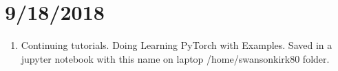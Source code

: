 \documentclass[12pt,reqno]{amsart}
\numberwithin{equation}{section}
\begin{document}
\section{9/18/2018}
\begin{enumerate}
\item Continuing tutorials.  Doing Learning PyTorch with Examples.  Saved in a jupyter notebook with this name on laptop /home/swansonkirk80 folder.  
\end{enumerate}




\normalsize

\end{document}
